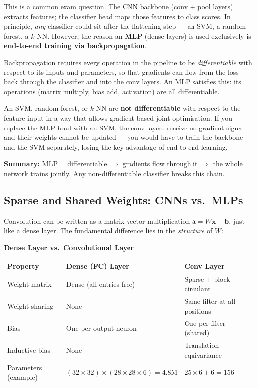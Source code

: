 \documentclass[11pt,a4paper]{article}
\begin{document}
\begin{warnbox}
This is a common exam question. The CNN backbone (conv + pool layers) extracts features; the classifier head maps those features to class scores. In principle, \emph{any} classifier could sit after the flattening step — an SVM, a random forest, a $k$-NN. However, the reason an \textbf{MLP} (dense layers) is used exclusively is \textbf{end-to-end training via backpropagation}.

Backpropagation requires every operation in the pipeline to be \emph{differentiable} with respect to its inputs and parameters, so that gradients can flow from the loss back through the classifier and into the conv layers. An MLP satisfies this: its operations (matrix multiply, bias add, activation) are all differentiable.

An SVM, random forest, or $k$-NN are \textbf{not differentiable} with respect to the feature input in a way that allows gradient-based joint optimisation. If you replace the MLP head with an SVM, the conv layers receive no gradient signal and their weights cannot be updated — you would have to train the backbone and the SVM separately, losing the key advantage of end-to-end learning.

\textbf{Summary:} MLP = differentiable $\Rightarrow$ gradients flow through it $\Rightarrow$ the whole network trains jointly. Any non-differentiable classifier breaks this chain.
\end{warnbox}

\subsection{Sparse and Shared Weights: CNNs vs.\ MLPs}
\label{sec:sparse_shared}

Convolution can be written as a matrix-vector multiplication $\mathbf{a} = W\mathbf{x} + \mathbf{b}$, just like a dense layer. The fundamental difference lies in the \emph{structure} of $W$:

\begin{tcolorbox}[colback=LightBlue,colframe=AccentBlue,boxrule=0.8pt,arc=3pt]
\textbf{Dense Layer vs.\ Convolutional Layer}\\[4pt]
\begin{tabular}{@{}lll@{}}
\toprule
\textbf{Property} & \textbf{Dense (FC) Layer} & \textbf{Conv Layer} \\
\midrule
Weight matrix & Dense (all entries free) & Sparse + block-circulant \\
Weight sharing & None & Same filter at all positions \\
Bias & One per output neuron & One per filter (shared) \\
Inductive bias & None & Translation equivariance \\
Parameters (example) & $(32\!\times\!32)\!\times\!(28\!\times\!28\!\times\!6) = 4.8\text{M}$ & $25\!\times\!6 + 6 = 156$ \\
\bottomrule
\end{tabular}
\end{tcolorbox}
\end{document}
